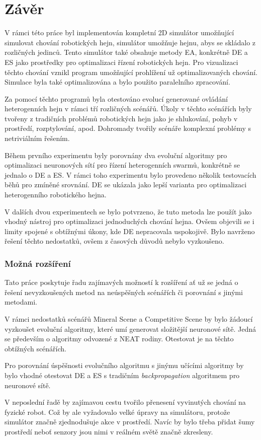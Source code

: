 \chapter*{Závěr}
V rámci této práce byl implementován kompletní 2D simulátor umožňující simulovat chování robotických hejn, simulátor umožňuje hejnu, abys se skládalo z rozličných jedinců. Tento simulátor také obsahuje metody EA, konkrétně DE a ES jako prostředky pro optimalizaci řízení robotických hejn. Pro vizualizaci těchto chování vznikl program umožňující prohlížení už optimalizovaných chování. Simulace byla také optimalizována a bylo použito paralelního zpracování. 
\par
Za pomocí těchto programů byla otestováno evolucí generované ovládání heterogenních hejn v rámci tří rozličných scénářů. Úkoly v těchto scénářích byly tvořeny z tradičních problémů robotických hejn jako je shlukování, pohyb v prostředí, rozptylování, apod. Dohromady tvořily scénáře komplexní problémy s netriviálním řešením. 
\par
Během prvního experimentu byly porovnány dva evoluční algoritmy pro optimalizaci neuronových sítí pro řízení heterogenních  swarmů, konkrétně se jednalo o DE a ES. V rámci toho experimentu bylo provedeno několik testovacích běhů pro zmíněné srovnání. DE se ukázala jako lepší varianta pro optimalizaci heterogenního robotického hejna. 
\par 
V dalších dvou experimentech se bylo potvrzeno, že tuto metoda lze použít jako vhodný nástroj pro optimalizaci jednoduchých chování hejna. Ovšem objevili se i limity spojené s obtížnými úkony, kde DE nepracovala uspokojivě. Bylo navrženo řešení těchto nedostatků, ovšem z časových důvodů nebylo vyzkoušeno. 

\subsection*{Možná rozšíření}
Tato práce poskytuje řadu zajímavých možností k rozšíření ať už se jedná o řešení nevyzkoušených metod na neúspěšných scénářích či porovnání s jinými metodami.\par
V rámci nedostatků scénářů Mineral Scene a Competitive Scene by bylo žádoucí vyzkoušet evoluční algoritmy, které umí generovat složitější neuronové sítě. Jedná se především o algoritmy odvozené z NEAT rodiny. Otestovat je na těchto obtížných scénářích.
\par
Pro porovnání úspěšnosti evolučního algoritmu s jinýmu učícími algoritmy by bylo vhodné otestovat DE a ES s tradičním \textit{backpropagation} algoritmem pro neuronové sítě. 
\par
V neposlední řadě by zajímavou cestu tvořilo přenesení vyvinutých chování na fyzické robot. Což by ale vyžadovalo velké úpravy na simulátoru, protože simulátor značně zjednodušuje akce v prostředí. Navíc by bylo třeba přidat šumy prostředí neboť senzory jsou nimi v reálném světě značně zkresleny. 